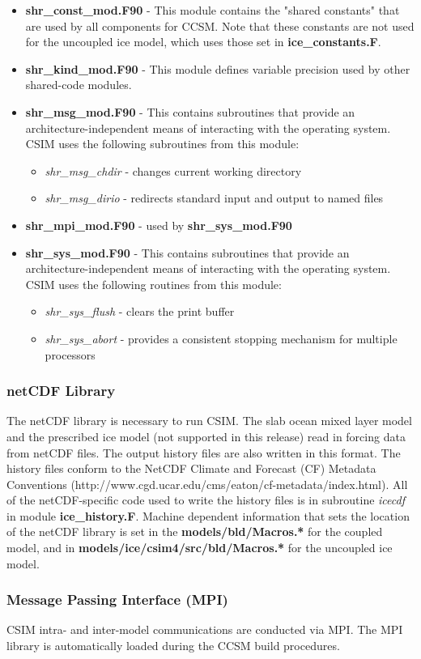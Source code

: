   \begin{itemize}
    \item {\bf shr\_const\_mod.F90} - This module contains the "shared constants"
          that are used by all components for CCSM.  Note that these constants
          are not used for the uncoupled ice model, which uses those set in
          {\bf ice\_constants.F}.

    \item {\bf shr\_kind\_mod.F90} - This module defines variable precision
          used by other shared-code modules.

    \item {\bf shr\_msg\_mod.F90} - This contains subroutines that provide an
          architecture-independent means of interacting with the operating system. CSIM
          uses the following subroutines from this module:

      \begin{itemize}
        \item {\it shr\_msg\_chdir} - changes current working directory
        \item {\it shr\_msg\_dirio} - redirects standard input and output to
                                    named files
      \end{itemize}

    \item {\bf shr\_mpi\_mod.F90} -  used by {\bf shr\_sys\_mod.F90}

    \item {\bf shr\_sys\_mod.F90} - This contains subroutines that provide an
          architecture-independent means of interacting with the operating system. CSIM
          uses the following routines from this module:
      \begin{itemize}
          \item {\it shr\_sys\_flush} - clears the print buffer
          \item {\it shr\_sys\_abort} - provides a consistent stopping mechanism for
                                      multiple processors
      \end{itemize}
  \end{itemize}

\subsubsection {netCDF Library}

The netCDF library is necessary to run CSIM.  The slab ocean mixed layer model and
the prescribed ice model (not supported in this release) read in forcing data from
netCDF files. The output history files are also written in this format. The history
files conform to the NetCDF Climate and Forecast (CF) Metadata Conventions 
(http://www.cgd.ucar.edu/cms/eaton/cf-metadata/index.html).
All of the netCDF-specific code used to write the history files is in subroutine
{\it icecdf} in module {\bf ice\_history.F}.   Machine dependent information that
sets the location of the netCDF library is set in the {\bf models/bld/Macros.*}
for the coupled model, and in {\bf models/ice/csim4/src/bld/Macros.*} for the
uncoupled ice model.


\subsubsection {Message Passing Interface (MPI)}

CSIM intra- and inter-model communications are conducted via MPI. The MPI
library is automatically loaded during the CCSM build procedures.

